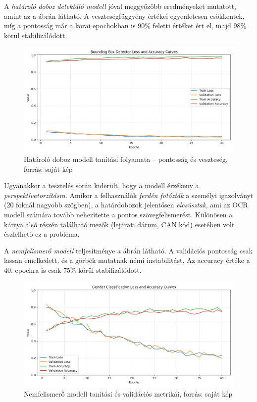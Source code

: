 \documentclass[
]{thesis-ekf}
\theoremstyle{definition}
\theoremstyle{remark}
\begin{document}
A \emph{határoló doboz detektáló modell} jóval meggyőzőbb eredményeket mutatott, amint az a  ábrán látható. A veszteségfüggvény értékei egyenletesen csökkentek, míg a pontosság már a korai epochokban is 90\% feletti értéket ért el, majd 98\% körül stabilizálódott.

\begin{figure} \centering \includegraphics[width=\textwidth]{ideal_learning_curves} \caption{Határoló doboz modell tanítási folyamata -- pontosság és veszteség, forrás: saját kép} \label{fig-bbox-training} \end{figure}

Ugyanakkor a tesztelés során kiderült, hogy a modell érzékeny a \emph{perspektívatorzításra}. Amikor a felhasználók \emph{ferdén fotózták} a személyi igazolványt (20 foknál nagyobb szögben), a határdobozok jelentősen \emph{elcsúsztak}, ami az OCR modell számára tovább nehezítette a pontos szövegfelismerést. Különösen a kártya alsó részén található mezők (lejárati dátum, CAN kód) esetében volt észlelhető ez a probléma.

A \emph{nemfelismerő modell} teljesítménye a  ábrán látható. A validációs pontosság csak lassan emelkedett, és a görbék mutatnak némi instabilitást. Az accuracy értéke a 40. epochra is csak 75\% körül stabilizálódott.

\begin{figure} \centering \includegraphics[width=\textwidth]{gender_learning_curves} \caption{Nemfelismerő modell tanítási és validációs metrikái, forrás: saját kép} \label{fig-gender-training} \end{figure}
\end{document}

